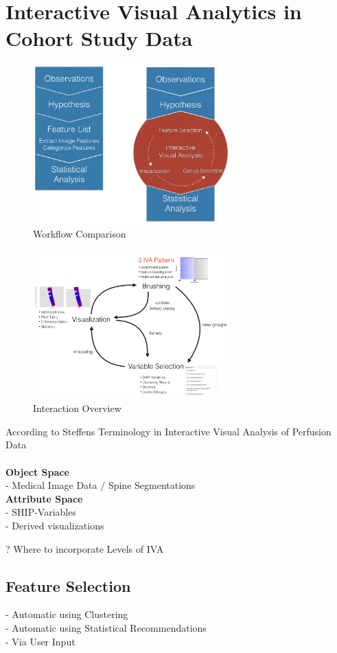 \documentclass[journal]{style/vgtc}           %
\begin{document}
\section{Interactive Visual Analytics in Cohort Study Data}
\begin{figure}[htb]
 \centering
 \includegraphics[width=3.0in]{figures/workflow_comparison}
 \caption{Workflow Comparison}
\end{figure}
\begin{figure}[htb]
 \centering
 \includegraphics[width=3.0in]{figures/InteractionLoop}
 \caption{Interaction Overview}
\end{figure}

According to Steffens Terminology in Interactive Visual Analysis of Perfusion Data
\\\\
\textbf{Object Space}\\
- Medical Image Data / Spine Segmentations\\
\textbf{Attribute Space}\\
- SHIP-Variables\\
- Derived visualizations

? Where to incorporate Levels of IVA

\subsection{Feature Selection}
- Automatic using Clustering\\
- Automatic using Statistical Recommendations\\
- Via User Input
\end{document}
